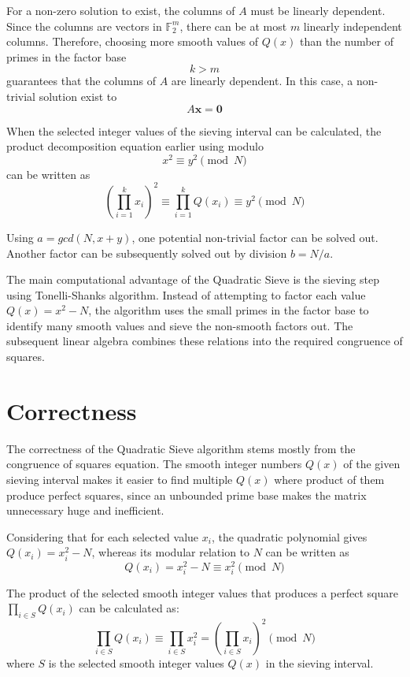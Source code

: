 \documentclass[11pt,a4paper]{article}
\begin{document}
For a non-zero solution to exist, the columns of $A$ must be linearly dependent. Since the columns are vectors in $\mathbb{F}_2^m$, there can be at most $m$ linearly independent columns. Therefore, choosing more smooth values of $Q(x)$ than the number of primes in the factor base
\[
k>m
\]
guarantees that the columns of $A$ are linearly dependent. In this case, a non-trivial solution exist to
\[
A\mathbf{x}=\mathbf{0}
\]

When the selected integer values of the sieving interval can be calculated, the product decomposition equation earlier using modulo
\[
x^2 \equiv y^2 \pmod N
\]
can be written as
\[
    \left(\prod_{i=1}^{k} x_i\right)^2
    \equiv
    \prod_{i=1}^{k} Q(x_i)
    \equiv y^2
    \pmod N
\]

Using $a = gcd(N, x+y)$, one potential non-trivial factor can be solved out. Another factor can be subsequently solved out by division $b = N/a$.

The main computational advantage of the Quadratic Sieve is the sieving step using Tonelli-Shanks algorithm. Instead of attempting to factor each value $Q(x) = x^2-N$, the algorithm uses the small primes in the factor base to identify many smooth values and sieve the non-smooth factors out. The subsequent linear algebra combines these relations into the required congruence of squares.

\section*{Correctness}

The correctness of the Quadratic Sieve algorithm stems mostly from the congruence of squares equation. The smooth integer numbers $Q(x)$ of the given sieving interval makes it easier to find multiple $Q(x)$ where product of them produce perfect squares, since an unbounded prime base makes the matrix unnecessary huge and inefficient. 

Considering that for each selected value $x_i$, the quadratic polynomial gives $Q(x_i) = x_i^2 - N$, whereas its modular relation to $N$ can be written as
\[
Q(x_i) = x_i^2 - N\equiv x_i^2 \pmod N
\]

The product of the selected smooth integer values that produces a perfect square $\prod_{i\in S} Q(x_i)$ can be calculated as:
\[
    \prod_{i\in S} Q(x_i) \equiv \prod_{i\in S} x_i^2 = \left(\prod_{i\in S}x_i\right)^2
\pmod N
\]
where $S$ is the selected smooth integer values $Q(x)$ in the sieving interval.
\end{document}

